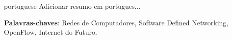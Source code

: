 \begin{resumo}
\begin{otherlanguage*}{portuguese}
Adicionar resumo em portugues...

    \vspace{\onelineskip}

    \noindent\textbf{Palavras-chaves}: Redes de Computadores, Software Defined Networking, OpenFlow, Internet do Futuro. 

    \end{otherlanguage*}
\end{resumo}




